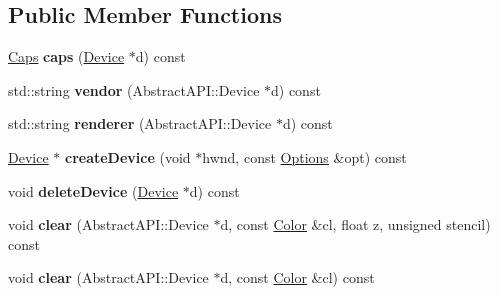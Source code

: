 \subsection*{Public Member Functions}
\begin{DoxyCompactItemize}
\item 
\hypertarget{class_tempest_1_1_opengl2x_a3607dc06ac4a37093cce804a8000f947}{\hyperlink{struct_tempest_1_1_abstract_a_p_i_1_1_caps}{Caps} {\bfseries caps} (\hyperlink{struct_tempest_1_1_opengl2x_1_1_device}{Device} $\ast$d) const }\label{class_tempest_1_1_opengl2x_a3607dc06ac4a37093cce804a8000f947}

\item 
\hypertarget{class_tempest_1_1_opengl2x_a8cd7d319b424b6c9c33d18e4a122983e}{std\+::string {\bfseries vendor} (Abstract\+A\+P\+I\+::\+Device $\ast$d) const }\label{class_tempest_1_1_opengl2x_a8cd7d319b424b6c9c33d18e4a122983e}

\item 
\hypertarget{class_tempest_1_1_opengl2x_a284cc8666959b8799de5c277de4fffb6}{std\+::string {\bfseries renderer} (Abstract\+A\+P\+I\+::\+Device $\ast$d) const }\label{class_tempest_1_1_opengl2x_a284cc8666959b8799de5c277de4fffb6}

\item 
\hypertarget{class_tempest_1_1_opengl2x_a9b19542a96f89364feb5b6f80cecc7e0}{\hyperlink{struct_tempest_1_1_opengl2x_1_1_device}{Device} $\ast$ {\bfseries create\+Device} (void $\ast$hwnd, const \hyperlink{struct_tempest_1_1_abstract_a_p_i_1_1_options}{Options} \&opt) const }\label{class_tempest_1_1_opengl2x_a9b19542a96f89364feb5b6f80cecc7e0}

\item 
\hypertarget{class_tempest_1_1_opengl2x_ac5af4fe226794b139a7304dff6dc7dc2}{void {\bfseries delete\+Device} (\hyperlink{struct_tempest_1_1_opengl2x_1_1_device}{Device} $\ast$d) const }\label{class_tempest_1_1_opengl2x_ac5af4fe226794b139a7304dff6dc7dc2}

\item 
\hypertarget{class_tempest_1_1_opengl2x_ab2b0cb4294e11eeb642371e8ef56c0da}{void {\bfseries clear} (Abstract\+A\+P\+I\+::\+Device $\ast$d, const \hyperlink{class_tempest_1_1_color}{Color} \&cl, float z, unsigned stencil) const }\label{class_tempest_1_1_opengl2x_ab2b0cb4294e11eeb642371e8ef56c0da}

\item 
\hypertarget{class_tempest_1_1_opengl2x_a322eed312d9870f75e73bcd0d953d526}{void {\bfseries clear} (Abstract\+A\+P\+I\+::\+Device $\ast$d, const \hyperlink{class_tempest_1_1_color}{Color} \&cl) const }\label{class_tempest_1_1_opengl2x_a322eed312d9870f75e73bcd0d953d526}


\end{DoxyCompactItemize}
